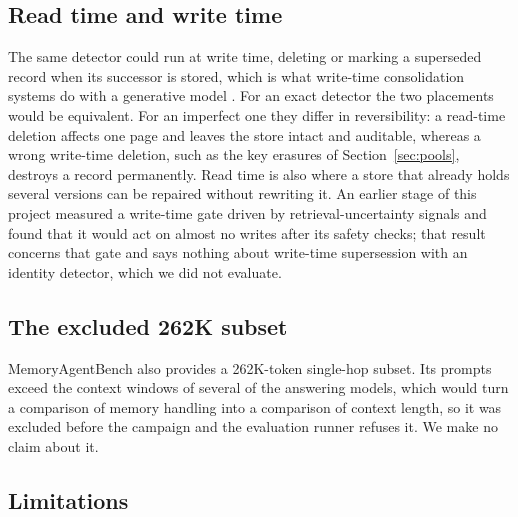 \documentclass[journal=jcisd8,manuscript=article]{achemso}
\begin{document}
\subsection{Read time and write time}
\label{sec:readwrite}

The same detector could run at write time, deleting or marking a superseded record when its successor is stored, which is what write-time consolidation systems do with a generative model \cite{chhikara2025mem0,rasmussen2025zep}. For an exact detector the two placements would be equivalent. For an imperfect one they differ in reversibility: a read-time deletion affects one page and leaves the store intact and auditable, whereas a wrong write-time deletion, such as the key erasures of Section~\ref{sec:pools}, destroys a record permanently. Read time is also where a store that already holds several versions can be repaired without rewriting it. An earlier stage of this project measured a write-time gate driven by retrieval-uncertainty signals and found that it would act on almost no writes after its safety checks; that result concerns that gate and says nothing about write-time supersession with an identity detector, which we did not evaluate.

\subsection{The excluded 262K subset}
\label{sec:excluded}

MemoryAgentBench also provides a 262K-token single-hop subset. Its prompts exceed the context windows of several of the answering models, which would turn a comparison of memory handling into a comparison of context length, so it was excluded before the campaign and the evaluation runner refuses it. We make no claim about it.

\subsection{Limitations}
\label{sec:limitations}
\end{document}
